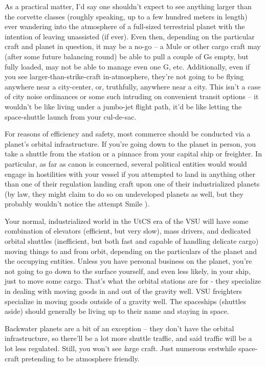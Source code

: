 As a practical matter, I'd say one shouldn't expect to see anything
larger than the corvette classes (roughly speaking, up to a few
hundred meters in length) ever wandering into the atmosphere of a
full-sized terrestrial planet with the intention of leaving unassisted
(if ever). Even then, depending on the particular craft and planet in
question, it may be a no-go -- a Mule or other cargo craft may (after
some future balancing round) be able to pull a couple of Gs empty, but
fully loaded, may not be able to manage even one G, etc. Additionally,
even if you see larger-than-strike-craft in-atmosphere, they're not
going to be flying anywhere near a city-center, or, truthfully,
anywhere near a city. This isn't a case of city noise ordinances or
some such intruding on convenient transit options -- it wouldn't be
like living under a jumbo-jet flight path, it'd be like letting the
space-shuttle launch from your cul-de-sac.

For reasons of efficiency and safety, most commerce should be
conducted via a planet's orbital infrastructure. If you're going down
to the planet in person, you take a shuttle from the station or a
pinnace from your capital ship or freighter. In particular, as far as
canon is concerned, several political entities would would engage in
hostilities with your vessel if you attempted to land in anything
other than one of their regulation landing craft upon one of their
industrialized planets (by law, they might claim to do so on
undeveloped planets as well, but they probably wouldn't notice the
attempt Smile ).

Your normal, industrialized world in the UtCS era of the VSU will have
some combination of elevators (efficient, but very slow), mass
drivers, and dedicated orbital shuttles (inefficient, but both fast
and capable of handling delicate cargo) moving things to and from
orbit, depending on the particulars of the planet and the occupying
entities. Unless you have personal business on the planet, you're not
going to go down to the surface yourself, and even less likely, in
your ship, just to move some cargo. That's what the orbital stations
are for - they specialize in dealing with moving goods in and out of
the gravity well. VSU freighters specialize in moving goods outside of
a gravity well. The spaceships (shuttles aside) should generally be
living up to their name and staying in space.

Backwater planets are a bit of an exception -- they don't have the
orbital infrastructure, so there'll be a lot more shuttle traffic, and
said traffic will be a lot less regulated. Still, you won't see {\emph
large} craft. Just numerous erstwhile space-craft pretending to be
atmosphere friendly.

